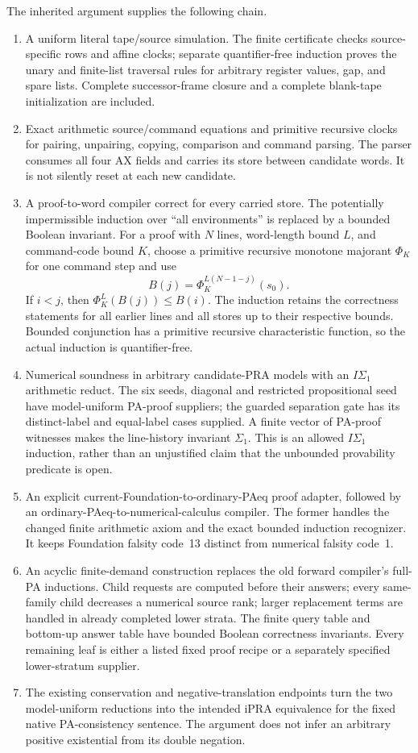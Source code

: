 The inherited argument supplies the following chain.
\begin{enumerate}
\item A uniform literal tape/source simulation.  The finite certificate
checks source-specific rows and affine clocks; separate quantifier-free
induction proves the unary and finite-list traversal rules for arbitrary
register values, gap, and spare lists.  Complete successor-frame closure
and a complete blank-tape initialization are included.
\item Exact arithmetic source/command equations and primitive recursive
clocks for pairing, unpairing, copying, comparison and command parsing.
The parser consumes all four AX fields and carries its store between
candidate words.  It is not silently reset at each new candidate.
\item A proof-to-word compiler correct for every carried store.  The
potentially impermissible induction over ``all environments'' is replaced
by a bounded Boolean invariant.  For a proof with $N$ lines, word-length
bound $L$, and command-code bound $K$, choose a primitive recursive monotone
majorant $\Phi_K$ for one command step and use
\[
 B(j)=\Phi_K^{L(N-1-j)}(s_0).
\]
If $i<j$, then $\Phi_K^L(B(j))\le B(i)$.  The induction retains the
correctness statements for all earlier lines and all stores up to their
respective bounds.  Bounded conjunction has a primitive recursive
characteristic function, so the actual induction is quantifier-free.
\item Numerical soundness in arbitrary candidate-PRA models with an
$I\Sigma_1$ arithmetic reduct.  The six seeds, diagonal and restricted
propositional seed have model-uniform PA-proof suppliers; the guarded
separation gate has its distinct-label and equal-label cases supplied.
A finite vector of PA-proof witnesses makes the line-history invariant
$\Sigma_1$.  This is an allowed $I\Sigma_1$ induction, rather than an
unjustified claim that the unbounded provability predicate is open.
\item An explicit current-Foundation-to-ordinary-PAeq proof adapter,
followed by an ordinary-PAeq-to-numerical-calculus compiler.  The former
handles the changed finite arithmetic axiom and the exact bounded
induction recognizer.  It keeps Foundation falsity code~13 distinct from
numerical falsity code~1.
\item An acyclic finite-demand construction replaces the old forward
compiler's full-PA inductions.  Child requests are computed before their
answers; every same-family child decreases a numerical source rank;
larger replacement terms are handled in already completed lower strata.
The finite query table and bottom-up answer table have bounded Boolean
correctness invariants.  Every remaining leaf is either a listed fixed
proof recipe or a separately specified lower-stratum supplier.
\item The existing conservation and negative-translation endpoints turn
the two model-uniform reductions into the intended iPRA equivalence for
the fixed native PA-consistency sentence.  The argument does not infer an
arbitrary positive existential from its double negation.
\end{enumerate}

